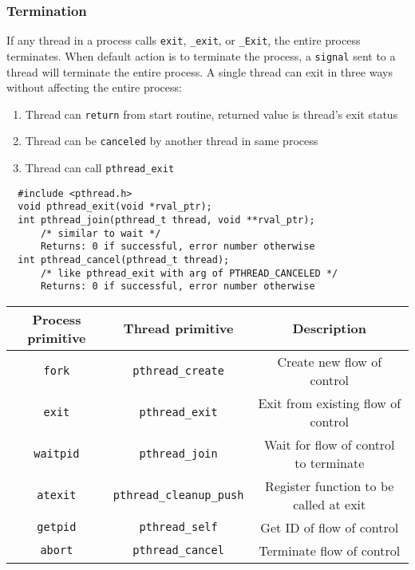 \documentclass[10pt]{article}
\begin{document}
\begin{multicols}{2}
\begin{minipage}{\columnwidth}
        \subsubsection*{Termination}
        If any thread in a process calls \texttt{exit}, \texttt{\_exit}, or
        \texttt{\_Exit}, the entire process terminates.
        When default action is to terminate the process, a \texttt{signal}
        sent to a thread will terminate the entire process.
        A single thread can exit in three ways without affecting the entire process:
        \begin{enumerate}
            \item Thread can \texttt{return} from start routine, returned value is
                  thread's exit status
            \item Thread can be \texttt{canceled} by another thread in same process
            \item Thread can call \texttt{pthread\_exit}
        \end{enumerate}
        \begin{lstlisting}
  #include <pthread.h>
  void pthread_exit(void *rval_ptr);
  int pthread_join(pthread_t thread, void **rval_ptr);
      /* similar to wait */
      Returns: 0 if successful, error number otherwise
  int pthread_cancel(pthread_t thread);
      /* like pthread_exit with arg of PTHREAD_CANCELED */
      Returns: 0 if successful, error number otherwise
        \end{lstlisting}
        \hspace*{-3em}
        \begin{tabular}{|c|c|c|}
            \hline
            Process primitive & Thread primitive                & Description                            \\
            \hline \hline
            \texttt{fork}     & \texttt{pthread\_create}        & Create new flow of control             \\
            \texttt{exit}     & \texttt{pthread\_exit}          & Exit from existing flow of control     \\
            \texttt{waitpid}  & \texttt{pthread\_join}          & Wait for flow of control to terminate  \\
            \texttt{atexit}   & \texttt{pthread\_cleanup\_push} & Register function to be called at exit \\
            \texttt{getpid}   & \texttt{pthread\_self}          & Get ID of flow of control              \\
            \texttt{abort}    & \texttt{pthread\_cancel}        & Terminate flow of control              \\
            \hline
        \end{tabular}


\end{minipage}
\end{multicols}
\end{document}
